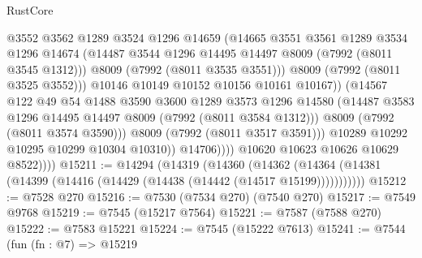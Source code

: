 \begin{lexlean}{RustCore}
\begin{coremodule}
                                @3552
                                @3562
                                @1289
                                @3524
                                @1296
                                @14659
                                (@14665
                                  @3551
                                  @3561
                                  @1289
                                  @3534
                                  @1296
                                  @14674
                                  (@14487
                                    @3544
                                    @1296
                                    @14495
                                    @14497
                                    @8009
                                    (@7992 (@8011 @3545 @1312)))
                                  @8009
                                  (@7992 (@8011 @3535 @3551)))
                                @8009
                                (@7992 (@8011 @3525 @3552)))
                              @10146
                              @10149
                              @10152
                              @10156
                              @10161
                              @10167))
                          (@14567
                            @122
                            @49
                            @54
                            @1488
                            @3590
                            @3600
                            @1289
                            @3573
                            @1296
                            @14580
                            (@14487 @3583 @1296 @14495 @14497 @8009 (@7992 (@8011 @3584 @1312)))
                            @8009
                            (@7992 (@8011 @3574 @3590)))
                          @8009
                          (@7992 (@8011 @3517 @3591)))
                        @10289
                        @10292
                        @10295
                        @10299
                        @10304
                        @10310))
                    @14706))))
            @10620
            @10623
            @10626
            @10629
            @8522))))
@15211 := @14294
    (@14319
      (@14360
        (@14362 (@14364 (@14381 (@14399 (@14416 (@14429 (@14438 (@14442 (@14517 @15199)))))))))))
@15212 := @7528 @270
@15216 := @7530 (@7534 @270) (@7540 @270)
@15217 := @7549 @9768
@15219 := @7545 (@15217 @7564)
@15221 := @7587 (@7588 @270)
@15222 := @7583 @15221
@15224 := @7545 (@15222 @7613)
@15241 := @7544
    (fun (fn : @7) =>
    @15219

\end{coremodule}
\end{lexlean}
